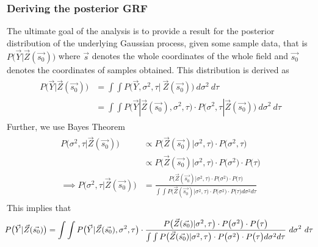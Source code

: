\subsubsection{Deriving the posterior GRF}
The ultimate goal of the analysis is to provide a result for the posterior distribution of the underlying Gaussian process, given some sample data, that is $P \big( \vec{Y} | \vec{Z}(\vec{s_0}) \big)$ where $\vec{s}$ denotes the whole coordinates of the whole field and $\vec{s_0}$ denotes the coordinates of samples obtained. This distribution is derived as 
\begin{align*}
\begin{split}
P \big( \vec{Y} | \vec{Z}(\vec{s_0}) \big) &= \int \int P \big( \vec{Y}, \sigma^2, \tau | \ \vec{Z}(\vec{s_0}) \big) \ d\sigma^2 \ d\tau \\
&= \int \int P \big( \vec{Y} | \vec{Z}(\vec{s_0}), \sigma^2, \tau \big) \cdot P\big( \sigma^2, \tau | \vec{Z}(\vec{s_0}) \big) \ d\sigma^2 \ d\tau 
\end{split}
\end{align*}
Further, we use Bayes Theorem 
\begin{align}\label{eq:posterior_prior}
\begin{split}
P\big( \sigma^2, \tau | \vec{Z}(\vec{s_0}) \big) &\propto P\big( \vec{Z}(\vec{s_0}) | \sigma^2, \tau \big) \cdot P\big( \sigma^2, \tau \big) \\[5pt]
&\propto P\big( \vec{Z}(\vec{s_0}) | \sigma^2, \tau \big) \cdot P\big( \sigma^2 \big) \cdot P\big( \tau \big) \\[10pt]
\implies P\big( \sigma^2, \tau | \vec{Z}(\vec{s_0}) \big) &= \frac{P\big( \vec{Z}(\vec{s_0}) | \sigma^2, \tau \big) \cdot P\big( \sigma^2 \big) \cdot P\big( \tau \big)}{\int \int P\big( \vec{Z}(\vec{s_0}) | \sigma^2, \tau \big) \cdot P\big( \sigma^2 \big) \cdot P\big( \tau \big) d\sigma^2 d\tau}
\end{split}
\end{align}
This implies that 
\begin{equation}\label{eq:grf_posterior}
\hspace*{-0.1cm}
P \big( \vec{Y} | \vec{Z}(\vec{s_0}) \big) = \int \int P \big( \vec{Y} | \vec{Z}(\vec{s_0}), \sigma^2, \tau \big) \cdot \frac{P\big( \vec{Z}(\vec{s_0}) | \sigma^2, \tau \big) \cdot P\big( \sigma^2 \big) \cdot P\big( \tau \big)}{\int \int P\big( \vec{Z}(\vec{s_0}) | \sigma^2, \tau \big) \cdot P\big( \sigma^2 \big) \cdot P\big( \tau \big) d\sigma^2 d\tau} \ d\sigma^2 \ d\tau
\end{equation}


